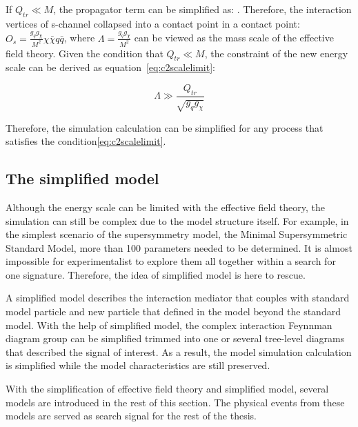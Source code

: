 If $Q_{tr} \ll M$, the propagator term can be simplified as: . Therefore, the interaction vertices of s-channel collapsed into a contact point in a contact point: $O_{s}=\frac{g_{q}g_{\chi}}{M^{2}}\chi\bar{\chi}q\bar{q}$, where $\Lambda=\frac{g_{q}g_{\chi}}{M^{2}}$ can be viewed as the mass scale of the effective field theory. Given the condition that $Q_{tr} \ll M$, the constraint of the new energy scale can be derived as equation~\ref{eq:c2scalelimit}:

\begin{equation}
  \Lambda \gg \frac{Q_{tr}}{\sqrt{g_{q}g_{\chi}}}
  \label{eq:c2scalelimit}
\end{equation}

Therefore, the simulation calculation can be simplified for any process that satisfies the condition\ref{eq:c2scalelimit}.

\subsection{The simplified model}
\par Although the energy scale can be limited with the effective field theory, the simulation can still be complex due to the model structure itself. For example, in the simplest scenario of the supersymmetry model, the Minimal Supersymmetric Standard Model, more than 100 parameters needed to be determined. It is almost impossible for experimentalist to explore them all together within a search for one signature. Therefore, the idea of simplified model\cite{SimplifiedModels-Alves2012} is here to rescue.

\par A simplified model describes the interaction mediator that couples with standard model particle and new particle that defined in the model beyond the standard model. With the help of simplified model, the complex interaction Feynnman diagram group can be simplified trimmed into one or several tree-level diagrams that described the signal of interest. As a result, the model simulation calculation is simplified while the model characteristics are still preserved. 

\par With the simplification of effective field theory and simplified model, several models are introduced in the rest of this section. The physical events from these models are served as search signal for the rest of the thesis.

